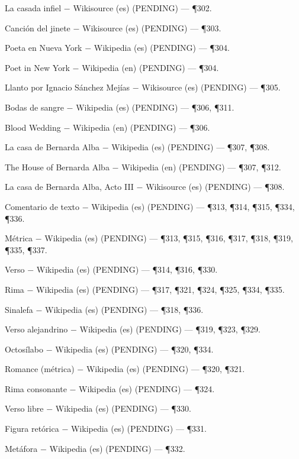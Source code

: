 \documentclass{book}
\begin{document}
\noindent La casada infiel \(-\) Wikisource (es) (PENDING) --- \P302.

\noindent Canción del jinete \(-\) Wikisource (es) (PENDING) --- \P303.

\noindent Poeta en Nueva York \(-\) Wikipedia (es) (PENDING) --- \P304.

\noindent Poet in New York \(-\) Wikipedia (en) (PENDING) --- \P304.

\noindent Llanto por Ignacio Sánchez Mejías \(-\) Wikisource (es) (PENDING) --- \P305.

\noindent Bodas de sangre \(-\) Wikipedia (es) (PENDING) --- \P306, \P311.

\noindent Blood Wedding \(-\) Wikipedia (en) (PENDING) --- \P306.

\noindent La casa de Bernarda Alba \(-\) Wikipedia (es) (PENDING) --- \P307, \P308.

\noindent The House of Bernarda Alba \(-\) Wikipedia (en) (PENDING) --- \P307, \P312.

\noindent La casa de Bernarda Alba, Acto III \(-\) Wikisource (es) (PENDING) --- \P308.

\noindent Comentario de texto \(-\) Wikipedia (es) (PENDING) --- \P313, \P314, \P315, \P334, \P336.

\noindent Métrica \(-\) Wikipedia (es) (PENDING) --- \P313, \P315, \P316, \P317, \P318, \P319, \P335, \P337.

\noindent Verso \(-\) Wikipedia (es) (PENDING) --- \P314, \P316, \P330.

\noindent Rima \(-\) Wikipedia (es) (PENDING) --- \P317, \P321, \P324, \P325, \P334, \P335.

\noindent Sinalefa \(-\) Wikipedia (es) (PENDING) --- \P318, \P336.

\noindent Verso alejandrino \(-\) Wikipedia (es) (PENDING) --- \P319, \P323, \P329.

\noindent Octosílabo \(-\) Wikipedia (es) (PENDING) --- \P320, \P334.

\noindent Romance (métrica) \(-\) Wikipedia (es) (PENDING) --- \P320, \P321.

\noindent Rima consonante \(-\) Wikipedia (es) (PENDING) --- \P324.

\noindent Verso libre \(-\) Wikipedia (es) (PENDING) --- \P330.

\noindent Figura retórica \(-\) Wikipedia (es) (PENDING) --- \P331.

\noindent Metáfora \(-\) Wikipedia (es) (PENDING) --- \P332.
\end{document}
